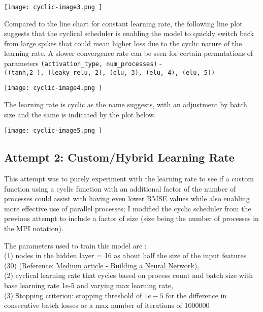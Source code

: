 \documentclass{article}
\begin{document}
\begin{center}
\texttt{[image: cyclic-image3.png ]}
\end{center}

Compared to the line chart for constant learning rate, the following line plot suggests that the cyclical scheduler is enabling the model to quickly switch back from large spikes that could mean higher loss due to the cyclic nature of the learning rate. A slower convergence rate can be seen for  certain permutations of parameters \verb|(activation_type, num_processes)| - \\ \verb|((tanh,2 ), (leaky_relu, 2), (elu, 3), (elu, 4), (elu, 5))|

\begin{center}
\texttt{[image: cyclic-image4.png ]}
\end{center}

The learning rate is cyclic as the name suggests, with an adjustment by batch size and the same is indicated by the plot below.

\begin{center}
\texttt{[image: cyclic-image5.png ]}
\end{center}

\subsection {Attempt 2: Custom/Hybrid Learning Rate }
This attempt was to purely experiment with the learning rate to see if a custom function using a cyclic function with an additional factor of the number of processes could assist with having even lower RMSE values while also enabling more effective use of parallel processes; I modified the cyclic scheduler from the previous attempt to include a factor of size (size being the number of processes in the MPI notation).

The parameters used to train this model are : \\
(1) nodes in the hidden layer = 16 as about half the size of the input features (30) (Reference: \href{https://medium.com/data-science/17-rules-of-thumb-for-building-a-neural-network-93356f9930af}{Medium article - Building a Neural Network}), \\
(2) cyclical learning rate that cycles based on process count and batch size with base learning rate 1e-5 and varying max learning rate, \\
(3) Stopping criterion: stopping threshold of $1e-5$ for the difference in consecutive batch losses or a max number of iterations of 1000000
\end{document}
